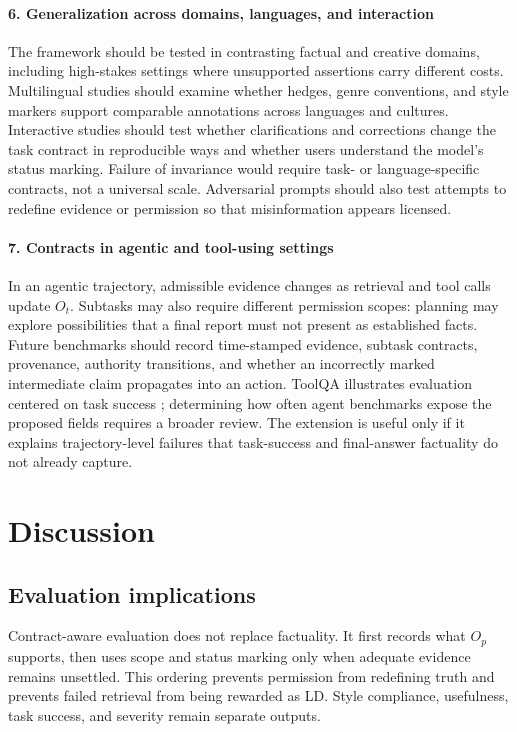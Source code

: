 \documentclass{clv2025}
\newcommand{\LD}{\textsc{LD}}
\begin{document}
\paragraph{6. Generalization across domains, languages, and interaction}
The framework should be tested in contrasting factual and creative
domains, including high-stakes settings where unsupported assertions carry
different costs.
Multilingual studies should examine whether hedges, genre conventions, and
style markers support comparable annotations across languages and
cultures.
Interactive studies should test whether clarifications and corrections
change the task contract in reproducible ways and whether users understand
the model's status marking.
Failure of invariance would require task- or language-specific contracts,
not a universal scale.
Adversarial prompts should also test attempts to redefine evidence or
permission so that misinformation appears licensed.

\paragraph{7. Contracts in agentic and tool-using settings}
In an agentic trajectory, admissible evidence changes as retrieval and tool
calls update $O_t$.
Subtasks may also require different permission scopes: planning may explore
possibilities that a final report must not present as established facts.
Future benchmarks should record time-stamped evidence, subtask contracts,
provenance, authority transitions, and whether an incorrectly marked
intermediate claim propagates into an action.
ToolQA illustrates evaluation centered on task success
\citep{zhuang_toolqa_2023}; determining how often agent benchmarks expose
the proposed fields requires a broader review.
The extension is useful only if it explains trajectory-level failures that
task-success and final-answer factuality do not already capture.

\section{Discussion}\label{sec:discussion}

\subsection{Evaluation implications}

Contract-aware evaluation does not replace factuality.
It first records what $O_p$ supports, then uses scope and status marking
only when adequate evidence remains unsettled.
This ordering prevents permission from redefining truth and prevents
failed retrieval from being rewarded as \LD.
Style compliance, usefulness, task success, and severity remain separate
outputs.
\end{document}
